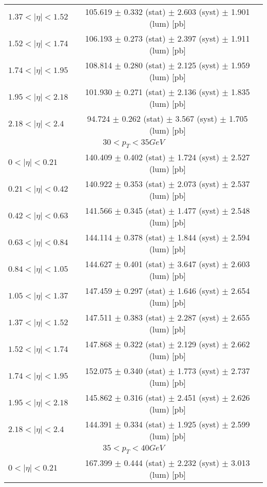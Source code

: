 \begin{tabular}{lc}
$1.37 < |\eta| <1.52$          & 105.619 $\pm$ 0.332 (stat) $\pm$ 2.603 (syst) $\pm$ 1.901 (lum) [pb]  \\
$1.52 < |\eta| <1.74$          & 106.193 $\pm$ 0.273 (stat) $\pm$ 2.397 (syst) $\pm$ 1.911 (lum) [pb]  \\
$1.74 < |\eta| <1.95$          & 108.814 $\pm$ 0.280 (stat) $\pm$ 2.125 (syst) $\pm$ 1.959 (lum) [pb]  \\
$1.95 < |\eta| <2.18$          & 101.930 $\pm$ 0.271 (stat) $\pm$ 2.136 (syst) $\pm$ 1.835 (lum) [pb]  \\
$2.18 < |\eta| <2.4$           & 94.724 $\pm$ 0.262 (stat) $\pm$ 3.567 (syst) $\pm$ 1.705 (lum) [pb]  \\
\hline
\multicolumn{2}{c}{$30 < p_{T} < 35 GeV$} \\
\hline
$0 < |\eta| <0.21$             & 140.409 $\pm$ 0.402 (stat) $\pm$ 1.724 (syst) $\pm$ 2.527 (lum) [pb]  \\
$0.21 < |\eta| <0.42$          & 140.922 $\pm$ 0.353 (stat) $\pm$ 2.073 (syst) $\pm$ 2.537 (lum) [pb]  \\
$0.42 < |\eta| <0.63$          & 141.566 $\pm$ 0.345 (stat) $\pm$ 1.477 (syst) $\pm$ 2.548 (lum) [pb]  \\
$0.63 < |\eta| <0.84$          & 144.114 $\pm$ 0.378 (stat) $\pm$ 1.844 (syst) $\pm$ 2.594 (lum) [pb]  \\
$0.84 < |\eta| <1.05$          & 144.627 $\pm$ 0.401 (stat) $\pm$ 3.647 (syst) $\pm$ 2.603 (lum) [pb]  \\
$1.05 < |\eta| <1.37$          & 147.459 $\pm$ 0.297 (stat) $\pm$ 1.646 (syst) $\pm$ 2.654 (lum) [pb]  \\
$1.37 < |\eta| <1.52$          & 147.511 $\pm$ 0.383 (stat) $\pm$ 2.287 (syst) $\pm$ 2.655 (lum) [pb]  \\
$1.52 < |\eta| <1.74$          & 147.868 $\pm$ 0.322 (stat) $\pm$ 2.129 (syst) $\pm$ 2.662 (lum) [pb]  \\
$1.74 < |\eta| <1.95$          & 152.075 $\pm$ 0.340 (stat) $\pm$ 1.773 (syst) $\pm$ 2.737 (lum) [pb]  \\
$1.95 < |\eta| <2.18$          & 145.862 $\pm$ 0.316 (stat) $\pm$ 2.451 (syst) $\pm$ 2.626 (lum) [pb]  \\
$2.18 < |\eta| <2.4$           & 144.391 $\pm$ 0.334 (stat) $\pm$ 1.925 (syst) $\pm$ 2.599 (lum) [pb]  \\
\hline
\multicolumn{2}{c}{$35 < p_{T} < 40 GeV$} \\
\hline
$0 < |\eta| <0.21$             & 167.399 $\pm$ 0.444 (stat) $\pm$ 2.232 (syst) $\pm$ 3.013 (lum) [pb]  \\

\end{tabular}
